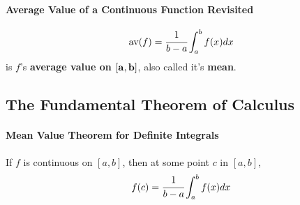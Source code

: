 \documentclass{article}
\begin{document}
            \paragraph{Average Value of a Continuous Function Revisited}
                \[\text{av}(f)=\cfrac{1}{b-a}\int_a^bf(x)dx\]
                is $f$'s \textbf{average value on $\bf{[a,b]}$}, also called it's \textbf{mean}.
        \subsection{The Fundamental Theorem of Calculus}
            \paragraph{Mean Value Theorem for Definite Integrals} If $f$ is continuous on $[a,b]$, then at some point $c$ in $[a,b]$,
            \[f(c)=\cfrac{1}{b-a}\int_a^b f(x)dx\]
\end{document}

